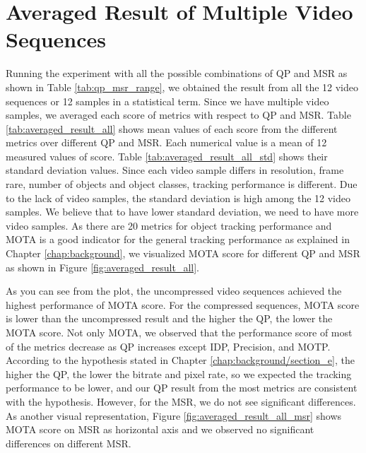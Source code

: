\section{Averaged Result of Multiple Video Sequences}
\label{sec:results/section_a}

Running the experiment with all the possible combinations of QP and MSR as shown in Table \ref{tab:qp_msr_range}, we obtained the result from all the 12 video sequences or 12 samples in a statistical term. Since we have multiple video samples, we averaged each score of metrics with respect to QP and MSR. Table \ref{tab:averaged_result_all} shows mean values of each score from the different metrics over different QP and MSR. Each numerical value is a mean of 12 measured values of score. Table \ref{tab:averaged_result_all_std} shows their standard deviation values. Since each video sample differs in resolution, frame rare, number of objects and object classes, tracking performance is different. Due to the lack of video samples, the standard deviation is high among the 12 video samples. We believe that to have lower standard deviation, we need to have more video samples. As there are 20 metrics for object tracking performance and MOTA is a good indicator for the general tracking performance as explained in Chapter \ref{chap:background}, we visualized MOTA score for different QP and MSR as shown in Figure \ref{fig:averaged_result_all}. 



As you can see from the plot, the uncompressed video sequences achieved the highest performance of MOTA score. For the compressed sequences, MOTA score is lower than the uncompressed result and the higher the QP, the lower the MOTA score. Not only MOTA, we observed that the performance score of most of the metrics decrease as QP increases except IDP, Precision, and MOTP. According to the hypothesis stated in Chapter \ref{chap:background/section_e}, the higher the QP, the lower the bitrate and pixel rate, so we expected the tracking performance to be lower, and our QP result from the most metrics are consistent with the hypothesis. However, for the MSR, we do not see significant differences. As another visual representation, Figure \ref{fig:averaged_result_all_msr} shows MOTA score on MSR as horizontal axis and we observed no significant differences on different MSR.


